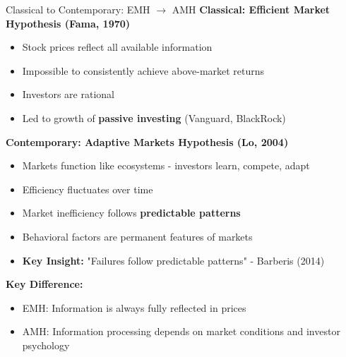 \documentclass[aspectratio=169,10pt]{beamer}
\renewcommand{\small}{\fontsize{7pt}{8.5pt}\selectfont}
\renewcommand{\large}{\fontsize{9pt}{11pt}\selectfont}
\newcommand{\question}[1]{{\large\bfseries\color{crimson}#1}}
\begin{document}
	\begin{frame}{Classical to Contemporary: EMH $\rightarrow$ AMH}
		\question{Classical: Efficient Market Hypothesis (Fama, 1970)}
		\small
		\begin{itemize}
			\item Stock prices reflect all available information
			\item Impossible to consistently achieve above-market returns
			\item Investors are rational
			\item Led to growth of \textbf{passive investing} (Vanguard, BlackRock)
		\end{itemize}
		
		\vspace{0.1cm}
		\question{Contemporary: Adaptive Markets Hypothesis (Lo, 2004)}
		\small
		\begin{itemize}
			\item Markets function like ecosystems - investors learn, compete, adapt
			\item Efficiency fluctuates over time
			\item Market inefficiency follows \textbf{predictable patterns}
			\item Behavioral factors are permanent features of markets
			\item \textbf{Key Insight:} "Failures follow predictable patterns" - Barberis (2014)
		\end{itemize}
		
		\vspace{0.1cm}
		\question{Key Difference:}
		\small
		\begin{itemize}
			\item EMH: Information is always fully reflected in prices
			\item AMH: Information processing depends on market conditions and investor psychology
		\end{itemize}
	\end{frame}
	
	
\end{document}
